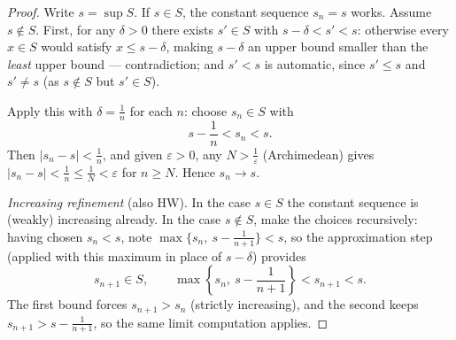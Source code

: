 \documentclass[11pt]{report}
\begin{document}
\begin{proof}
Write $s = \sup S$. If $s \in S$, the constant sequence $s_n = s$ works. Assume $s \notin S$. First, for any $\delta > 0$ there exists $s' \in S$ with $s - \delta < s' < s$: otherwise every $x \in S$ would satisfy $x \leq s - \delta$, making $s - \delta$ an upper bound smaller than the \emph{least} upper bound --- contradiction; and $s' < s$ is automatic, since $s' \leq s$ and $s' \neq s$ (as $s \notin S$ but $s' \in S$).

Apply this with $\delta = \tfrac1n$ for each $n$: choose $s_n \in S$ with
\[
s - \frac1n < s_n < s.
\]
Then $|s_n - s| < \tfrac1n$, and given $\varepsilon > 0$, any $N > \tfrac1\varepsilon$ (Archimedean) gives $|s_n - s| < \tfrac1n \leq \tfrac1N < \varepsilon$ for $n \geq N$. Hence $s_n \to s$.

\emph{Increasing refinement} (also HW). In the case $s \in S$ the constant sequence is (weakly) increasing already. In the case $s \notin S$, make the choices recursively: having chosen $s_n < s$, note $\max\{s_n,\ s - \tfrac{1}{n+1}\} < s$, so the approximation step (applied with this maximum in place of $s - \delta$) provides
\[
s_{n+1} \in S, \qquad \max\left\{ s_n,\ s - \frac{1}{n+1} \right\} < s_{n+1} < s.
\]
The first bound forces $s_{n+1} > s_n$ (strictly increasing), and the second keeps $s_{n+1} > s - \tfrac{1}{n+1}$, so the same limit computation applies.
\end{proof}
\end{document}
